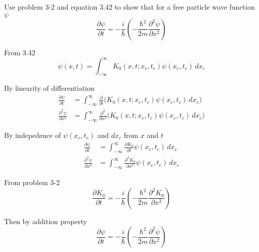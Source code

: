 \documentclass[12pt]{article}
\begin{document}
\noindent
Use problem 3-2 and equation 3.42 to show that for a free particle wave function $\psi$
\begin{equation*}
\frac{\partial\psi}{\partial t}=-\frac{i}{\hbar}
\left(-\frac{\hbar^2}{2m}\frac{\partial^2\psi}{\partial x^2}\right)
\end{equation*}

\noindent
From 3.42
\begin{equation*}
\psi(x,t)=\int_{-\infty}^\infty K_0(x,t;x_c,t_c)\psi(x_c,t_c)\,dx_c
\end{equation*}

\noindent
By linearity of differentiation
\begin{align*}
\frac{\partial\psi}{\partial t}
&=\int_{-\infty}^\infty \frac{\partial}{\partial t} \bigg(K_0(x,t;x_c,t_c)\psi(x_c,t_c)\,dx_c\bigg)
\\
\frac{\partial^2\psi}{\partial x^2}
&=\int_{-\infty}^\infty \frac{\partial^2}{\partial x^2} \bigg(K_0(x,t;x_c,t_c)\psi(x_c,t_c)\,dx_c\bigg)
\end{align*}

\noindent
By indepedence of $\psi(x_c,t_c)$ and $dx_c$ from $x$ and $t$
\begin{align*}
\frac{\partial\psi}{\partial t}
&=\int_{-\infty}^\infty \frac{\partial K_0}{\partial t}\psi(x_c,t_c)\,dx_c
\\
\frac{\partial^2\psi}{\partial x^2}
&=\int_{-\infty}^\infty \frac{\partial^2 K_0}{\partial x^2}\psi(x_c,t_c)\,dx_c
\end{align*}

\noindent
From problem 3-2
\begin{equation*}
\frac{\partial K_0}{\partial t}=-\frac{i}{\hbar}
\left(-\frac{\hbar^2}{2m}\frac{\partial^2 K_0}{\partial x^2}\right)
\end{equation*}

\noindent
Then by addition property
\begin{equation*}
\frac{\partial\psi}{\partial t}=-\frac{i}{\hbar}
\left(-\frac{\hbar^2}{2m}\frac{\partial^2\psi}{\partial x^2}\right)
\end{equation*}
\end{document}
